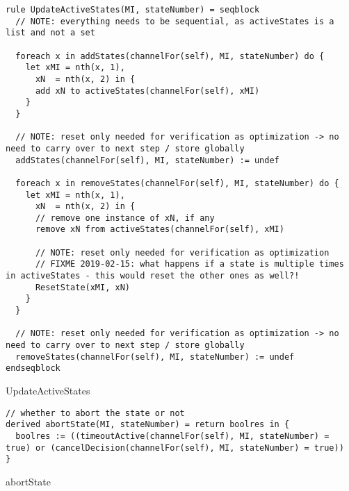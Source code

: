 \begin{listing}[H]
\begin{verbatim}
rule UpdateActiveStates(MI, stateNumber) = seqblock
  // NOTE: everything needs to be sequential, as activeStates is a list and not a set

  foreach x in addStates(channelFor(self), MI, stateNumber) do {
    let xMI = nth(x, 1),
      xN  = nth(x, 2) in {
      add xN to activeStates(channelFor(self), xMI)
    }
  }

  // NOTE: reset only needed for verification as optimization -> no need to carry over to next step / store globally
  addStates(channelFor(self), MI, stateNumber) := undef

  foreach x in removeStates(channelFor(self), MI, stateNumber) do {
    let xMI = nth(x, 1),
      xN  = nth(x, 2) in {
      // remove one instance of xN, if any
      remove xN from activeStates(channelFor(self), xMI)

      // NOTE: reset only needed for verification as optimization
      // FIXME 2019-02-15: what happens if a state is multiple times in activeStates - this would reset the other ones as well?!
      ResetState(xMI, xN)
    }
  }

  // NOTE: reset only needed for verification as optimization -> no need to carry over to next step / store globally
  removeStates(channelFor(self), MI, stateNumber) := undef
endseqblock
\end{verbatim}
\caption{UpdateActiveStates}
\label{lst:asm:UpdateActiveStates}
\end{listing}




\begin{listing}[H]
\begin{verbatim}
// whether to abort the state or not
derived abortState(MI, stateNumber) = return boolres in {
  boolres := ((timeoutActive(channelFor(self), MI, stateNumber) = true) or (cancelDecision(channelFor(self), MI, stateNumber) = true))
}
\end{verbatim}
\caption{abortState}
\label{lst:asm:abortState}
\end{listing}




